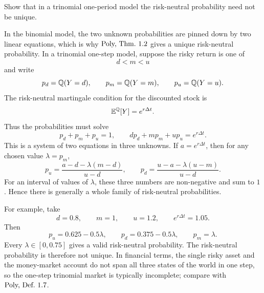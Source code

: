\begin{exercise}
Show that in a trinomial one-period model the risk-neutral probability need
not be unique.
\end{exercise}

\begin{solution}
In the binomial model, the two unknown probabilities are pinned down by two
linear equations, which is why \(\textup{Poly, Thm.~1.2}\) gives a unique
risk-neutral probability.  In a trinomial one-step model, suppose the risky
return is one of
\[
  d<m<u
\]
and write
\[
  p_d=\mathbb{Q}(Y=d),\qquad p_m=\mathbb{Q}(Y=m),\qquad p_u=\mathbb{Q}(Y=u).
\]
The risk-neutral martingale condition for the discounted stock is
\[
  \mathbb{E}^{\mathbb{Q}}[Y]=e^{r\Delta t}.
\]
Thus the probabilities must solve
\[
  p_d+p_m+p_u=1,\qquad
  dp_d+mp_m+up_u=e^{r\Delta t}.
\]
This is a system of two equations in three unknowns.  If
\(a=e^{r\Delta t}\), then for any chosen value \(\lambda=p_m\),
\[
  p_u=\frac{a-d-\lambda(m-d)}{u-d},
  \qquad
  p_d=\frac{u-a-\lambda(u-m)}{u-d}.
\]
For an interval of values of \(\lambda\), these three numbers are non-negative
and sum to \(1\).  Hence there is generally a whole family of risk-neutral
probabilities.

For example, take
\[
  d=0.8,\qquad m=1,\qquad u=1.2,\qquad e^{r\Delta t}=1.05.
\]
Then
\[
  p_u=0.625-0.5\lambda,\qquad
  p_d=0.375-0.5\lambda,\qquad
  p_m=\lambda.
\]
Every \(\lambda\in[0,0.75]\) gives a valid risk-neutral probability.  The
risk-neutral probability is therefore not unique.  In financial terms, the
single risky asset and the money-market account do not span all three states
of the world in one step, so the one-step trinomial market is typically
incomplete; compare with \(\textup{Poly, Def.~1.7}\).
\end{solution}
